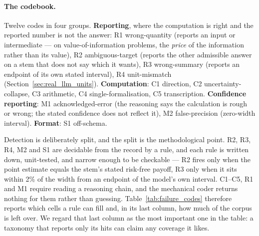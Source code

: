 \documentclass{article}
\begin{document}
\paragraph{The codebook.} Twelve codes in four groups. \textbf{Reporting}, where the computation is right and the reported number is not the answer: R1 wrong-quantity (reports an input or intermediate --- on value-of-information problems, the \emph{price} of the information rather than its value), R2 ambiguous-target (reports the other admissible answer on a stem that does not say which it wants), R3 wrong-summary (reports an endpoint of its own stated interval), R4 unit-mismatch (Section~\ref{sec:real_llm_units}). \textbf{Computation}: C1 direction, C2 uncertainty-collapse, C3 arithmetic, C4 single-formalisation, C5 transcription. \textbf{Confidence reporting}: M1 acknowledged-error (the reasoning says the calculation is rough or wrong; the stated confidence does not reflect it), M2 false-precision (zero-width interval). \textbf{Format}: S1 off-schema.

Detection is deliberately split, and the split is the methodological point. R2, R3, R4, M2 and S1 are decidable from the record by a rule, and each rule is written down, unit-tested, and narrow enough to be checkable --- R2 fires only when the point estimate equals the stem's stated risk-free payoff, R3 only when it sits within 2\% of the width from an endpoint of the model's own interval. C1--C5, R1 and M1 require reading a reasoning chain, and the mechanical coder returns nothing for them rather than guessing. Table~\ref{tab:failure_codes} therefore reports which cells a rule can fill and, in its last column, how much of the corpus is left over. We regard that last column as the most important one in the table: a taxonomy that reports only its hits can claim any coverage it likes.

\begin{table}[t]
\centering
\caption{Mechanically-decidable failure codes over all 361 incorrect predictions. \textbf{R4} is the corroborated unit mismatch of Section~\ref{sec:real_llm_units}: those answers are credited correct under the paper's primary accounting, so they are broken out here and excluded from every column to their right, leaving \textbf{rem} genuine errors per model. \textbf{CI covers} counts errors whose \emph{own stated interval} contains the ground-truth estimate. \textbf{uncoded} is the share carrying no mechanically-decidable code --- the denominator the judgment-coded classes must account for, reported rather than hidden. GPT-OSS-120B's row rests on nine errors in total, which bounds every per-model claim about it.}
\label{tab:failure_codes}
\end{table}
\end{document}
